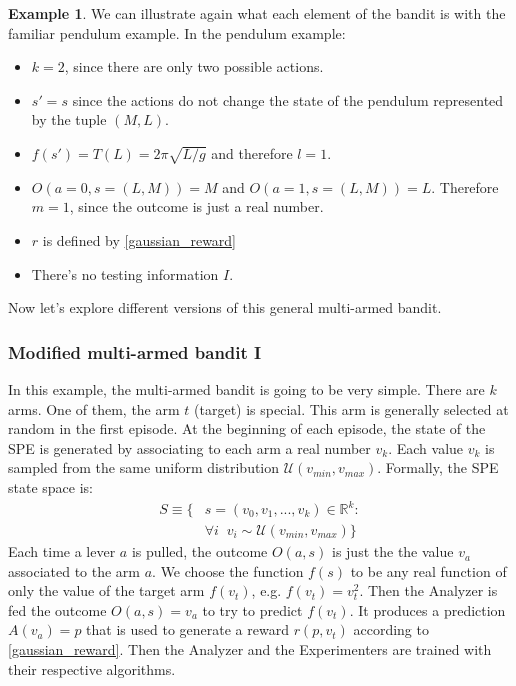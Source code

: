 \documentclass[11pt,a4paper,twoside]{report}
\newcommand{\+}{\textnormal{+} }
\theoremstyle{definition}
\newtheorem{myex}[mythm]{Example}
\numberwithin{equation}{chapter}
\begin{document}
\begin{myex}
  We can illustrate again what each element of the bandit is with the familiar
  pendulum example. In the pendulum example:
  \begin{itemize}
    \item $k=2$, since there are only two possible actions.
    \item $s'=s$ since the actions do not change the state of the pendulum 
    represented by the tuple $(M,L)$.
    \item $f(s')=T(L)=2\pi\sqrt{L/g}$ and therefore $l=1$.
    \item $O(a=0,s=(L,M))=M$ and $O(a=1, s=(L,M))=L$. Therefore $m=1$, since 
    the outcome is just a real number.
    \item $r$ is defined by \eqref{gaussian_reward}
    \item There's no testing information $I$.
  \end{itemize}
  
\end{myex}

Now let's explore different versions of this general multi-armed bandit.
\subsubsection{Modified multi-armed bandit I}

  In this example, the multi-armed bandit is going to be very simple. There are
  $k$ arms. One of them, the arm $t$ (target) is special. This arm is generally
  selected at random in the first episode. At the beginning of each episode, the
  state of the SPE is generated by associating to each arm a real number $v_k$.
  Each value $v_k$ is sampled from the same uniform distribution
  $\mathcal{U}(v_{min},v_{max})$. Formally, the SPE state space is:
  \begin{align}
    S\equiv\{&s=(v_0, v_1,...,v_k) \in \mathbb{R}^k: \\
    & \forall i \; \; v_i \sim \mathcal{U}(v_{min},v_{max})
    \}
  \end{align}
  Each time a lever $a$ is pulled, the outcome $O(a,s)$ is just the the value
  $v_a$ associated to the arm $a$. We choose the function $f(s)$ to be any real
  function of only the value of the target arm $f(v_t)$, e.g. $f(v_t)=v_t^2$.
  Then the Analyzer is fed the outcome $O(a,s)=v_a$ to try to predict $f(v_t)$.
  It produces a prediction $A(v_a)=p$ that is used to generate a reward
  $r(p,v_t)$ according to \eqref{gaussian_reward}. Then the Analyzer and the
  Experimenters are trained with their respective algorithms.
\end{document}
